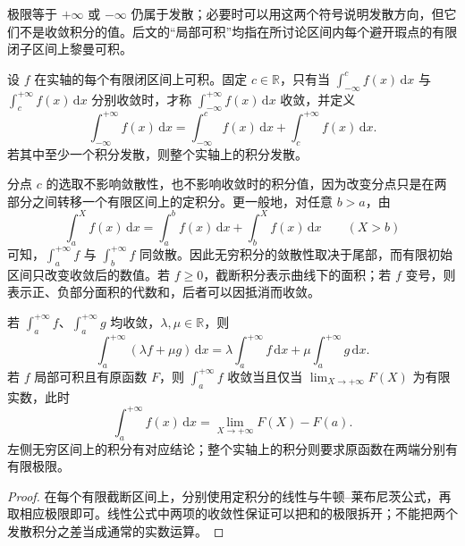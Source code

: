 极限等于 $+\infty$ 或 $-\infty$ 仍属于发散；必要时可以用这两个符号说明发散方向，但它们不是收敛积分的值。后文的“局部可积”均指在所讨论区间内每个避开瑕点的有限闭子区间上黎曼可积。

\begin{definition}[整个实轴上的无穷积分]
\label{def:improper-integral-whole-line}
设 $f$ 在实轴的每个有限闭区间上可积。固定 $c\in\mathbb{R}$，只有当 $\int_{-\infty}^c f(x)\,\mathrm{d}x$ 与 $\int_c^{+\infty}f(x)\,\mathrm{d}x$ 分别收敛时，才称 $\int_{-\infty}^{+\infty}f(x)\,\mathrm{d}x$ 收敛，并定义
\begin{equation}
    \int_{-\infty}^{+\infty}f(x)\,\mathrm{d}x
    =\int_{-\infty}^c f(x)\,\mathrm{d}x
     +\int_c^{+\infty}f(x)\,\mathrm{d}x.
    \label{eq:improper-integral-whole-line-split}
\end{equation}
若其中至少一个积分发散，则整个实轴上的积分发散。
\end{definition}

分点 $c$ 的选取不影响敛散性，也不影响收敛时的积分值，因为改变分点只是在两部分之间转移一个有限区间上的定积分。更一般地，对任意 $b>a$，由
\[
    \int_a^X f(x)\,\mathrm{d}x
    =\int_a^b f(x)\,\mathrm{d}x+\int_b^X f(x)\,\mathrm{d}x
    \qquad(X>b)
\]
可知，$\int_a^{+\infty}f$ 与 $\int_b^{+\infty}f$ 同敛散。因此无穷积分的敛散性取决于尾部，而有限初始区间只改变收敛后的数值。若 $f\geq0$，截断积分表示曲线下的面积；若 $f$ 变号，则表示正、负部分面积的代数和，后者可以因抵消而收敛。

\begin{proposition}[收敛积分的线性与原函数计算]
\label{prop:improper-integral-linearity-and-primitives}
若 $\int_a^{+\infty}f$、$\int_a^{+\infty}g$ 均收敛，$\lambda,\mu\in\mathbb{R}$，则
\[
    \int_a^{+\infty}(\lambda f+\mu g)\,\mathrm{d}x
    =\lambda\int_a^{+\infty}f\,\mathrm{d}x
     +\mu\int_a^{+\infty}g\,\mathrm{d}x.
\]
若 $f$ 局部可积且有原函数 $F$，则 $\int_a^{+\infty}f$ 收敛当且仅当 $\lim_{X\to+\infty}F(X)$ 为有限实数，此时
\begin{equation}
    \int_a^{+\infty}f(x)\,\mathrm{d}x
    =\lim_{X\to+\infty}F(X)-F(a).
    \label{eq:improper-newton-leibniz}
\end{equation}
左侧无穷区间上的积分有对应结论；整个实轴上的积分则要求原函数在两端分别有有限极限。
\end{proposition}

\begin{proof}
在每个有限截断区间上，分别使用定积分的线性与牛顿--莱布尼茨公式，再取相应极限即可。线性公式中两项的收敛性保证可以把和的极限拆开；不能把两个发散积分之差当成通常的实数运算。
\end{proof}

